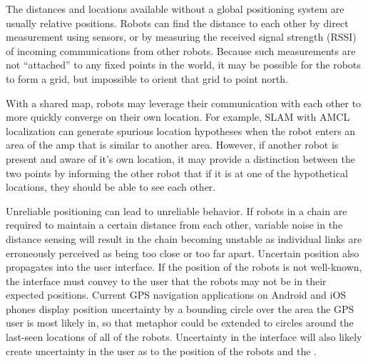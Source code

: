 \documentclass[]{article}
\begin{document}
The distances and locations available without a global positioning system are usually relative positions. 
Robots can find the distance to each other by direct measurement using sensors, or by measuring the received signal strength (RSSI) of incoming communications from other robots.
Because such measurements are not ``attached'' to any fixed points in the world, it may be possible for the robots to form a grid, but impossible to orient that grid to point north. 

With a shared map, robots may leverage their communication with each other to more quickly converge on their own location. 
For example, SLAM with AMCL localization can generate spurious location hypotheses when the robot enters an area of the amp that is similar to another area. However, if another robot is present and aware of it's own location, it may provide a distinction between the two points by informing the other robot that if it is at one of the hypothetical locations, they should be able to see each other. 

Unreliable positioning can lead to unreliable behavior. 
If robots in a chain are required to maintain a certain distance from each other, variable noise in the distance sensing will result in the chain becoming unstable as individual links are erroneously perceived as being too close or too far apart. 
Uncertain position also propagates into the user interface. 
If the position of the robots is not well-known, the interface must convey to the user that the robots may not be in their expected positions. 
Current GPS navigation applications on Android and iOS phones display position uncertainty by a bounding circle over the area the GPS user is most likely in, so that metaphor could be extended to circles around the last-seen locations of all of the robots. 
Uncertainty in the interface will also likely create uncertainty in the user as to the position of the robots and the . 
\end{document}
